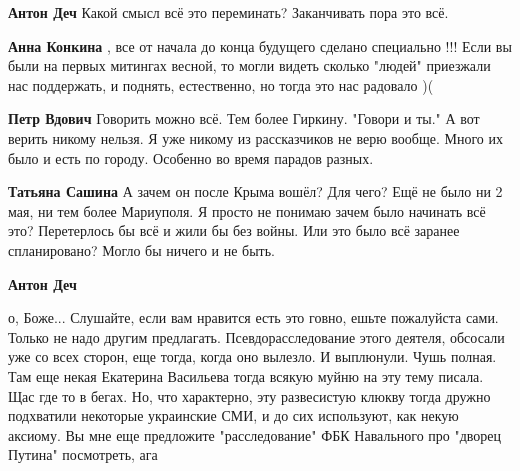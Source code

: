 \begin{itemize}
\begin{itemize}
\textbf{Антон Деч} Какой смысл всё это переминать? Заканчивать пора это всё.

 
\textbf{Анна Конкина} , все от начала до конца будущего сделано специально !!! Если вы были на первых митингах весной, то могли видеть сколько "людей" приезжали нас поддержать, и поднять, естественно, но тогда это нас радовало )(

 
\textbf{Петр Вдович} Говорить можно всё. Тем более Гиркину. "Говори и ты." А вот верить никому нельзя. Я уже никому из рассказчиков не верю вообще. Много их было и есть по городу. Особенно во время парадов разных.

 
\textbf{Татьяна Сашина} А зачем он после Крыма вошёл? Для чего? Ещё не было ни 2 мая, ни тем более Мариуполя. Я просто не понимаю зачем было начинать всё это? Перетерлось бы всё и жили бы без войны. Или это было всё заранее спланировано? Могло бы ничего и не быть.

 
\textbf{Антон Деч} 

о, Боже... Слушайте, если вам нравится есть это говно, ешьте пожалуйста сами.
Только не надо другим предлагать. Псевдорасследование этого деятеля, обсосали
уже со всех сторон, еще тогда, когда оно вылезло. И выплюнули. Чушь полная. Там
еще некая Екатерина Васильева тогда всякую муйню на эту тему писала. Щас где то
в бегах. Но, что характерно, эту развесистую клюкву тогда дружно подхватили
некоторые украинские СМИ, и до сих используют, как некую аксиому. Вы мне еще
предложите "расследование" ФБК Навального про "дворец Путина" посмотреть, ага
\Laughey[1.0][white]


\end{itemize}
\end{itemize}

